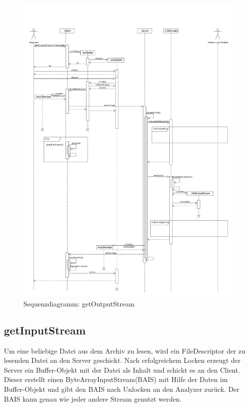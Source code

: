 \begin{figure}[H]
	\centering
	\label{dia:design:frontend:sqc:getOutputStream}
	\includegraphics[width=\textwidth]{design/frontend/sequence/get-output-stream-sequence.pdf}
	\caption{Sequenzdiagramm: getOutputStream}
\end{figure}

\subsection {getInputStream}

Um eine beliebige Datei aus dem Archiv zu lesen, wird ein FileDescriptor der zu lesenden Datei an den Server geschickt.
Nach erfolgreichem Locken erzeugt der Server ein Buffer-Objekt mit der Datei als Inhalt und schickt es an den Client.
Dieser erstellt einen ByteArrayInputStream(BAIS) mit Hilfe der Daten im Buffer-Objekt und gibt den BAIS nach Unlocken  an den Analyzer zurück.
Der BAIS kann genau wie jeder andere Stream genutzt werden.

